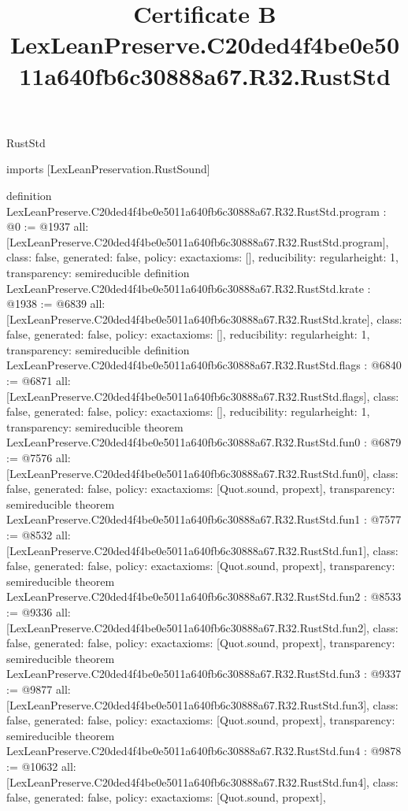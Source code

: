 \begin{lexlean}{RustStd}
\title{Certificate B LexLeanPreserve.C20ded4f4be0e5011a640fb6c30888a67.R32.RustStd}
\begin{coremodule}
imports [LexLeanPreservation.RustSound]

definition LexLeanPreserve.C20ded4f4be0e5011a640fb6c30888a67.R32.RustStd.program : @0 := @1937 {
  all: [LexLeanPreserve.C20ded4f4be0e5011a640fb6c30888a67.R32.RustStd.program],
  class: false,
  generated: false,
  policy: exact{axioms: []},
  reducibility: regular{height: 1},
  transparency: semireducible
}
definition LexLeanPreserve.C20ded4f4be0e5011a640fb6c30888a67.R32.RustStd.krate : @1938 := @6839 {
  all: [LexLeanPreserve.C20ded4f4be0e5011a640fb6c30888a67.R32.RustStd.krate],
  class: false,
  generated: false,
  policy: exact{axioms: []},
  reducibility: regular{height: 1},
  transparency: semireducible
}
definition LexLeanPreserve.C20ded4f4be0e5011a640fb6c30888a67.R32.RustStd.flags : @6840 := @6871 {
  all: [LexLeanPreserve.C20ded4f4be0e5011a640fb6c30888a67.R32.RustStd.flags],
  class: false,
  generated: false,
  policy: exact{axioms: []},
  reducibility: regular{height: 1},
  transparency: semireducible
}
theorem LexLeanPreserve.C20ded4f4be0e5011a640fb6c30888a67.R32.RustStd.fun0 : @6879 := @7576 {
  all: [LexLeanPreserve.C20ded4f4be0e5011a640fb6c30888a67.R32.RustStd.fun0],
  class: false,
  generated: false,
  policy: exact{axioms: [Quot.sound, propext]},
  transparency: semireducible
}
theorem LexLeanPreserve.C20ded4f4be0e5011a640fb6c30888a67.R32.RustStd.fun1 : @7577 := @8532 {
  all: [LexLeanPreserve.C20ded4f4be0e5011a640fb6c30888a67.R32.RustStd.fun1],
  class: false,
  generated: false,
  policy: exact{axioms: [Quot.sound, propext]},
  transparency: semireducible
}
theorem LexLeanPreserve.C20ded4f4be0e5011a640fb6c30888a67.R32.RustStd.fun2 : @8533 := @9336 {
  all: [LexLeanPreserve.C20ded4f4be0e5011a640fb6c30888a67.R32.RustStd.fun2],
  class: false,
  generated: false,
  policy: exact{axioms: [Quot.sound, propext]},
  transparency: semireducible
}
theorem LexLeanPreserve.C20ded4f4be0e5011a640fb6c30888a67.R32.RustStd.fun3 : @9337 := @9877 {
  all: [LexLeanPreserve.C20ded4f4be0e5011a640fb6c30888a67.R32.RustStd.fun3],
  class: false,
  generated: false,
  policy: exact{axioms: [Quot.sound, propext]},
  transparency: semireducible
}
theorem LexLeanPreserve.C20ded4f4be0e5011a640fb6c30888a67.R32.RustStd.fun4 : @9878 := @10632 {
  all: [LexLeanPreserve.C20ded4f4be0e5011a640fb6c30888a67.R32.RustStd.fun4],
  class: false,
  generated: false,
  policy: exact{axioms: [Quot.sound, propext]},
}
\end{coremodule}
\end{lexlean}
